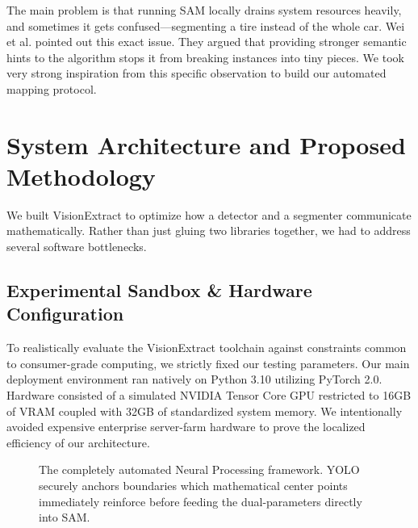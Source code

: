 \documentclass[10pt, conference]{IEEEtran}
\begin{document}
The main problem is that running SAM locally drains system resources heavily, and sometimes it gets confused—segmenting a tire instead of the whole car. Wei et al. \cite{b3} pointed out this exact issue. They argued that providing stronger semantic hints to the algorithm stops it from breaking instances into tiny pieces. We took very strong inspiration from this specific observation to build our automated mapping protocol.

\section{System Architecture and Proposed Methodology}
We built VisionExtract to optimize how a detector and a segmenter communicate mathematically. Rather than just gluing two libraries together, we had to address several software bottlenecks.

\subsection{Experimental Sandbox \& Hardware Configuration}
To realistically evaluate the VisionExtract toolchain against constraints common to consumer-grade computing, we strictly fixed our testing parameters. Our main deployment environment ran natively on Python 3.10 utilizing PyTorch 2.0. Hardware consisted of a simulated NVIDIA Tensor Core GPU restricted to 16GB of VRAM coupled with 32GB of standardized system memory. We intentionally avoided expensive enterprise server-farm hardware to prove the localized efficiency of our architecture. 

\begin{figure}[htbp]
\centering
{}
\caption{The completely automated Neural Processing framework. YOLO securely anchors boundaries which mathematical center points immediately reinforce before feeding the dual-parameters directly into SAM.}
\label{fig:architecture}
\end{figure}
\end{document}

